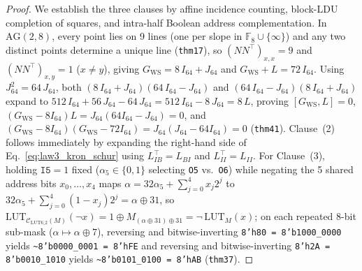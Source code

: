 \documentclass[11pt,letterpaper]{article}
\theoremstyle{spectralthm}
\begin{document}
\begin{proof}
We establish the three clauses by affine incidence counting, block-LDU completion of squares, and intra-half Boolean address complementation. In $\mathrm{AG}(2,8)$, every point lies on 9 lines (one per slope in $\mathbb{F}_8 \cup \{\infty\}$) and any two distinct points determine a unique line (\texttt{thm17}), so $(N N^\top)_{x,x} = 9$ and $(N N^\top)_{x,y} = 1$ ($x \neq y$), giving $G_{\mathrm{WS}} = 8\,I_{64} + J_{64}$ and $G_{\mathrm{WS}} + L = 72\,I_{64}$. Using $J_{64}^2 = 64\,J_{64}$, both $(8\,I_{64} + J_{64})(64\,I_{64} - J_{64})$ and $(64\,I_{64} - J_{64})(8\,I_{64} + J_{64})$ expand to $512\,I_{64} + 56\,J_{64} - 64\,J_{64} = 512\,I_{64} - 8\,J_{64} = 8\,L$, proving $[G_{\mathrm{WS}}, L] = 0$, $(G_{\mathrm{WS}}-8I_{64})L = J_{64}(64I_{64}-J_{64}) = 0$, and $(G_{\mathrm{WS}}-8I_{64})(G_{\mathrm{WS}}-72I_{64}) = J_{64}(J_{64}-64I_{64}) = 0$ (\texttt{thm41}). Clause~(2) follows immediately by expanding the right-hand side of Eq.~\eqref{eq:law3_kron_schur} using $L_{IB}^\top = L_{BI}$ and $L_{II}^\top = L_{II}$. For Clause~(3), holding $\texttt{I5} = 1$ fixed ($\alpha_5 \in \{0,1\}$ selecting \texttt{O5} vs.\ \texttt{O6}) while negating the 5 shared address bits $x_0,\dots,x_4$ maps $\alpha = 32\alpha_5 + \sum_{j=0}^4 x_j 2^j$ to $32\alpha_5 + \sum_{j=0}^4(1-x_j)2^j = \alpha \oplus 31$, so $\mathrm{LUT}_{\mathcal{C}_{\mathrm{LUT6\_2}}(M)}(\neg x) = 1 \oplus M_{(\alpha\oplus 31)\oplus 31} = \neg\,\mathrm{LUT}_M(x)$; on each repeated 8-bit sub-mask ($\alpha \mapsto \alpha \oplus 7$), reversing and bitwise-inverting \texttt{8'h80 = 8'b1000\_0000} yields \texttt{\~{}8'b0000\_0001 = 8'hFE} and reversing and bitwise-inverting \texttt{8'h2A = 8'b0010\_1010} yields \texttt{\~{}8'b0101\_0100 = 8'hAB} (\texttt{thm37}).
\end{proof}
\end{document}
